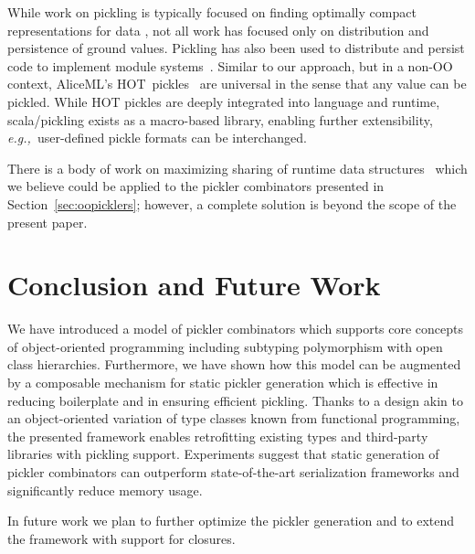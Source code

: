 \documentclass[10pt]{sigplanconf}
\theoremstyle{definition}
\theoremstyle{definition}
\newcommand{\eg}{{\em e.g.,~}}
\begin{document}
While work on pickling is typically focused on finding optimally compact
representations for data \cite{EveryBitCounts}, not all work has focused only
on distribution and persistence of ground values. Pickling has also been
used to distribute and persist code to implement module systems~\cite{Roy99,Rossberg2007}.
Similar to our approach, but in a non-OO context, AliceML's HOT~pickles~\cite{HOTPickles}
are universal in the sense that any value
can be pickled. While HOT pickles are deeply integrated into language and
runtime, scala/pickling exists as a macro-based library, enabling further
extensibility, \eg user-defined pickle formats can be interchanged.

There is a body of work on maximizing sharing of runtime data
structures~\cite{appel93hashconsing,Elsman2005,TackKS06} which we believe
could be applied to the pickler combinators presented in
Section~\ref{sec:oopicklers}; however, a complete solution is beyond the scope
of the present paper.



\section{Conclusion and Future Work}

We have introduced a model of pickler combinators which supports core
concepts of object-oriented programming including subtyping polymorphism
with open class hierarchies. Furthermore, we have shown how this model
can be augmented by a composable mechanism for static pickler
generation which is effective in reducing boilerplate and in ensuring
efficient pickling. Thanks to a design akin to an object-oriented
variation of type classes known from functional programming, the
presented framework enables retrofitting existing types and
third-party libraries with pickling support. Experiments suggest that
static generation of pickler combinators can outperform
state-of-the-art serialization frameworks and significantly reduce
memory usage.

In future work we plan to further optimize the pickler generation and
to extend the framework with support for closures.



\end{document}
